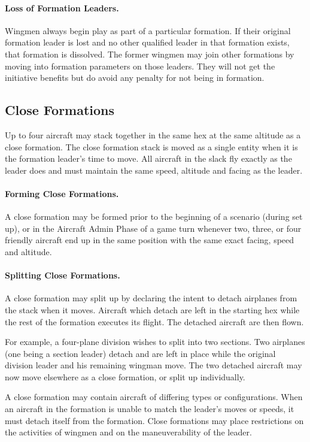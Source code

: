 {\paragraph{Loss of Formation Leaders.} Wingmen always begin play as part of a particular formation. If their original formation leader is lost and no other qualified leader in that formation exists, that formation is dissolved. The former wingmen may join other formations by moving into formation parameters on those leaders. They will not get the initiative benefits but do avoid any penalty for not being in formation.

\subsection{Close Formations}
\label{rule:close-formations}

Up to four aircraft may stack together in the same hex at the same altitude as a close formation. The close formation stack is moved as a single entity when it is the formation leader's time to move. All aircraft in the slack fly exactly as the leader does and must maintain the same speed, altitude and facing as the leader.

\paragraph{Forming Close Formations.} A close formation may be formed prior to the beginning of a scenario (during set up), or in the Aircraft Admin Phase of a game turn whenever two, three, or four friendly aircraft end up in the same position with the same exact facing, speed and altitude.

\paragraph{Splitting Close Formations.} A close formation may split up by declaring the intent to detach airplanes from the stack when it moves. Aircraft which detach are left in the starting hex while the rest of the formation executes its flight. The detached aircraft are then flown.

For example, a four-plane division wishes to split into two sections. Two airplanes (one being a section leader) detach and are left in place while the original division leader and his remaining wingman move. The two detached aircraft may now move elsewhere as a close formation, or split up individually.

A close formation may contain aircraft of differing types or configurations. When an aircraft in the formation is unable to match the leader's moves or speeds, it must detach itself from the formation. Close formations may place restrictions on the activities of wingmen and on the maneuverability of the leader.

}
